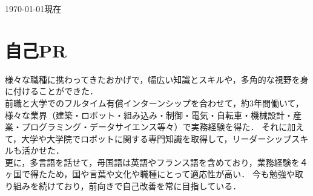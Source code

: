 \documentclass[10pt, a4paper]{article}
\begin{document}
\thispagestyle{plain}

\hfill{\footnotesize \today 現在}

\section{自己PR}
様々な職種に携わってきたおかげで，幅広い知識とスキルや，多角的な視野を身に付けることができた．
\\

前職と大学でのフルタイム有償インターンシップを合わせて，約3年間働いて，様々な業界（建築・ロボット・組み込み・制御・電気・自転車・機械設計・産業・プログラミング・データサイエンス等々）で実務経験を得た．
それに加えて，大学や大学院でロボットに関する専門知識を取得して，リーダーシップスキルも活かせた．
\\

更に，多言語を話せて，母国語は英語やフランス語を含めており，業務経験を４ヶ国で得たため，国や言葉や文化や職種にとって適応性が高い．
今も勉強や取り組みを続けており，前向きで自己改善を常に目指している．
\end{document}
